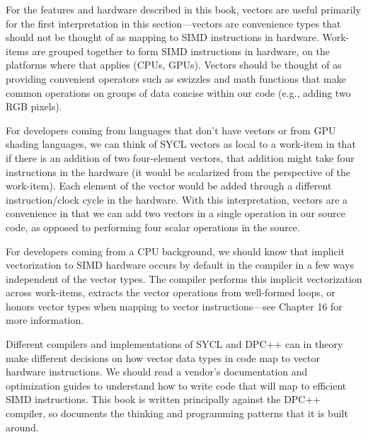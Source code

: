 For the features and hardware described in this book, vectors are useful primarily for the first interpretation in this section—vectors are convenience types that should not be thought of as mapping to SIMD instructions in hardware. Work-items are grouped together to form SIMD instructions in hardware, on the platforms where that applies (CPUs, GPUs). Vectors should be thought of as providing convenient operators such as swizzles and math functions that make common operations on groups of data concise within our code (e.g., adding two RGB pixels).\par

For developers coming from languages that don’t have vectors or from GPU shading languages, we can think of SYCL vectors as local to a work-item in that if there is an addition of two four-element vectors, that addition might take four instructions in the hardware (it would be scalarized from the perspective of the work-item). Each element of the vector would be added through a different instruction/clock cycle in the hardware. With this interpretation, vectors are a convenience in that we can add two vectors in a single operation in our source code, as opposed to performing four scalar operations in the source.\par

For developers coming from a CPU background, we should know that implicit vectorization to SIMD hardware occurs by default in the compiler in a few ways independent of the vector types. The compiler performs this implicit vectorization across work-items, extracts the vector operations from well-formed loops, or honors vector types when mapping to vector instructions—see Chapter 16 for more information.\par

\begin{tcolorbox}[colback=blue!5!white,colframe=blue!75!black, title=OTHER IMPLEMENTATIONS POSSIBLE!]
Different compilers and implementations of SYCL and DPC++ can in theory make different decisions on how vector data types in code map to vector hardware instructions. We should read a vendor’s documentation and optimization guides to understand how to write code that will map to efficient SIMD instructions. This book is written principally against the DPC++ compiler, so documents the thinking and programming patterns that it is built around.
\end{tcolorbox}

